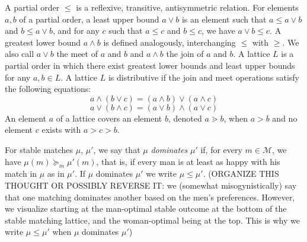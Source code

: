 \documentclass[12pt]{article}
\newcommand{\M}{\mathcal{M}}
\begin{document}
  A partial order $\le$ is a reflexive, transitive, antisymmetric relation.
  For elements $a,b$ of a partial order, a least upper bound $a\vee b$ is
  an element such that
  $a\le a\vee b$ and $b\le a \vee b$, and for any 
  $c$ such that $a\le c$ and $b\le c$, we have $a\vee b\le c$.
  A greatest lower bound $a\wedge b$ is defined analogously, interchanging $\le$
  with $\ge$.
  We also call $a\vee b$ the meet of $a$ and $b$ and $a\wedge b$ the join of $a$
  and $b$.
  A lattice $L$ is a partial order in which there exist greatest lower bounds and
  least upper bounds for any $a,b\in L$.
  A lattice $L$ is distributive if the join and meet operations satisfy
  the following equations:
  \[ a \wedge (b \vee c) = (a\wedge b)\vee (a\wedge c) \]
  \[ a \vee (b \wedge c) = (a\vee b)\wedge (a\vee c) \]
  An element $a$ of a lattice covers an element $b$, denoted $a \gtrdot b$,
  when $a > b$ and no element $c$ exists with $a > c > b$.

  For stable matches $\mu$, $\mu'$, we say that $\mu$ \emph{dominates} $\mu'$
  if, for every $m\in\M$, we have $\mu(m)\succeq_m \mu'(m)$,
  that is, if every man is at least as happy with his match in $\mu$
  as in $\mu'$.
  If $\mu$ dominates $\mu'$ we write $\mu\le \mu'$.
  (ORGANIZE THIS THOUGHT OR POSSIBLY REVERSE IT:
  we (somewhat misogynistically) say that one matching
  dominates another based on the men's preferences.
  However, we visualize starting at the man-optimal stable outcome at the bottom
  of the stable matching lattice, and the woman-optimal being at the top.
  This is why we write $\mu \le \mu'$ when $\mu$ dominates $\mu'$)
\end{document}
